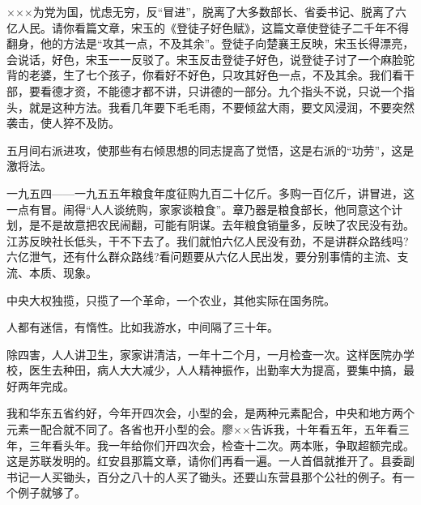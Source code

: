 ×××为党为国，忧虑无穷，反“冒进”，脱离了大多数部长、省委书记、脱离了六亿人民。请你看篇文章，宋玉的《登徒子好色赋》，这篇文章使登徒子二千年不得翻身，他的方法是“攻其一点，不及其余”。登徒子向楚襄王反映，宋玉长得漂亮，会说话，好色，宋玉一一反驳了。宋玉反击登徒子好色，说登徒子讨了一个麻脸驼背的老婆，生了七个孩子，你看好不好色，只攻其好色一点，不及其余。我们看干部，要看德才资，不能德才都不讲，只讲德的一部分。九个指头不说，只说一个指头，就是这种方法。我看几年要下毛毛雨，不要倾盆大雨，要文风浸润，不要突然袭击，使人猝不及防。

五月间右派进攻，使那些有右倾思想的同志提高了觉悟，这是右派的“功劳”，这是激将法。

一九五四——一九五五年粮食年度征购九百二十亿斤。多购一百亿斤，讲冒进，这一点有冒。闹得“人人谈统购，家家谈粮食”。章乃器是粮食部长，他同意这个计划，是不是故意把农民闹翻，可能有阴谋。去年粮食销量多，反映了农民没有劲。江苏反映社长低头，干不下去了。我们就怕六亿人民没有劲，不是讲群众路线吗?六亿泄气，还有什么群众路线?看问题要从六亿人民出发，要分别事情的主流、支流、本质、现象。

中央大权独揽，只揽了一个革命，一个农业，其他实际在国务院。

人都有迷信，有惰性。比如我游水，中间隔了三十年。

除四害，人人讲卫生，家家讲清洁，一年十二个月，一月检查一次。这样医院办学校，医生去种田，病人大大减少，人人精神振作，出勤率大为提高，要集中搞，最好两年完成。

我和华东五省约好，今年开四次会，小型的会，是两种元素配合，中央和地方两个元素一配合就不同了。各省也开小型的会。廖××告诉我，十年看五年，五年看三年，三年看头年。我一年给你们开四次会，检查十二次。两本账，争取超额完成。这是苏联发明的。红安县那篇文章，请你们再看一遍。一人首倡就推开了。县委副书记一人买锄头，百分之八十的人买了锄头。还要山东营县那个公社的例子。有一个例子就够了。



